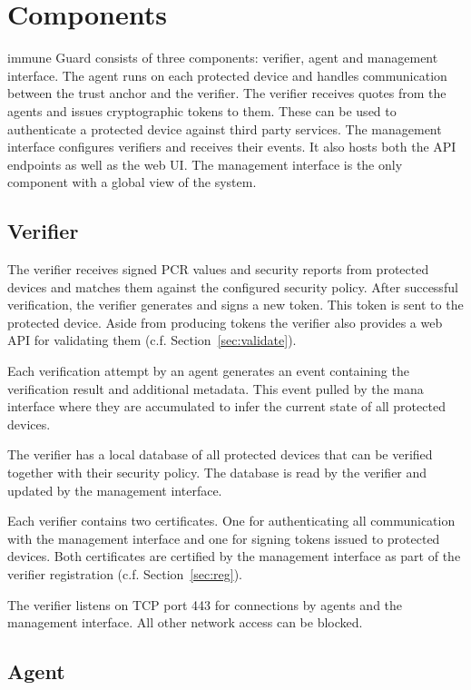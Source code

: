 \documentclass[a4paper,oneside,10pt,extrafontsizes]{memoir}
\begin{document}
\chapter{Components}
immune Guard consists of three components: verifier, agent and management
interface. The agent runs on each protected device and handles communication
between the trust anchor and the verifier. The verifier receives quotes from
the agents and issues cryptographic tokens to them. These can be used to
authenticate a protected device against third party services. The management
interface configures verifiers and receives their events. It also hosts both
the API endpoints as well as the web UI. The management interface is the
only component with a global view of the system.

\section{Verifier}
The verifier receives signed PCR values and security reports from protected
devices and matches them against the configured security policy. After
successful verification, the verifier generates and signs a new token. This
token is sent to the protected device. Aside from producing tokens the verifier
also provides a web API for validating them (c.f. Section~\ref{sec:validate}). 

Each verification attempt by an agent generates an event containing the
verification result and additional metadata. This event pulled by the mana
interface where they are accumulated to infer the current state of all
protected devices.

The verifier has a local database of all protected devices that can be
verified together with their security policy. The database is read by the
verifier and updated by the management interface.

Each verifier contains two certificates. One for authenticating all
communication with the management interface and one for signing tokens issued
to protected devices. Both certificates are certified by the management
interface as part of the verifier registration (c.f. Section~\ref{sec:reg}). 

The verifier listens on TCP port 443 for connections by agents and the
management interface. All other network access can be blocked.

\section{Agent}
\end{document}
